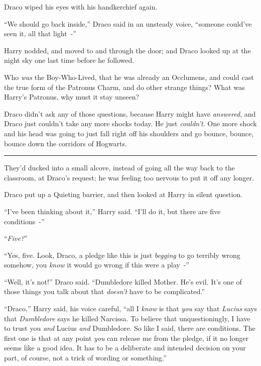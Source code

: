 Draco wiped his eyes with his handkerchief again.

``We should go back inside,'' Draco said in an unsteady voice, ``someone could've seen it, all that light~-''

Harry nodded, and moved to and through the door; and Draco looked up at the night sky one last time before he followed.

Who \emph{was} the Boy-Who-Lived, that he was already an Occlumens, and could cast the true form of the Patronus Charm, and do other strange things? What was Harry's Patronus, why must it stay unseen?

Draco didn't ask any of those questions, because Harry might have \emph{answered}, and Draco just couldn't take any more shocks today. He just \emph{couldn't}. One more shock and his head was going to just fall right off his shoulders and go bounce, bounce, bounce down the corridors of Hogwarts.

\begin{center}\rule{3in}{0.4pt}\end{center}

They'd ducked into a small alcove, instead of going all the way back to the classroom, at Draco's request; he was feeling too nervous to put it off any longer.

Draco put up a Quieting barrier, and then looked at Harry in silent question.

``I've been thinking about it,'' Harry said. ``I'll do it, but there are five conditions~-''

``\emph{Five?}''

``Yes, five. Look, Draco, a pledge like this is just \emph{begging} to go terribly wrong somehow, you \emph{know} it would go wrong if this were a play~-''

``Well, it's not!'' Draco said. ``Dumbledore killed Mother. He's evil. It's one of those things you talk about that \emph{doesn't} have to be complicated.''

``Draco,'' Harry said, his voice careful, ``all I \emph{know} is that \emph{you} say that \emph{Lucius} says that \emph{Dumbledore} says he killed Narcissa. To believe that unquestioningly, I have to trust you \emph{and} Lucius \emph{and} Dumbledore. So like I said, there are conditions. The first one is that at any point \emph{you} can release me from the pledge, if it no longer seems like a good idea. It has to be a deliberate and intended decision on your part, of course, not a trick of wording or something.''

